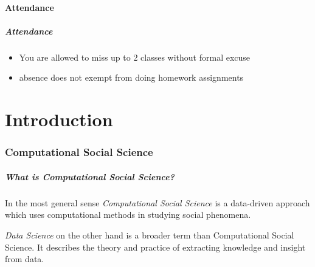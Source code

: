 \subsection[Attendance]{Attendance}
\begin{frame}
    \frametitle{Attendance}
    \begin{itemize}
        \item You are allowed to miss up to 2 classes without formal excuse
        \item  absence does not exempt from doing homework assignments
    \end{itemize}
\end{frame}


\part[Introduction]{Introduction}
\frame{\partpage}

\section[CSS]{Computational Social Science}

\begin{frame}
    \frametitle{What is Computational Social Science?}
    \begin{definition}{}
        In the most general sense \emph{Computational Social Science} is a data-driven approach which uses computational methods in studying social phenomena.
    \end{definition}
    \begin{definition}{}
        \emph{Data Science} on the other hand is a broader term than Computational Social Science. It describes the theory and practice of extracting knowledge and insight from data.
    \end{definition}
\end{frame}


